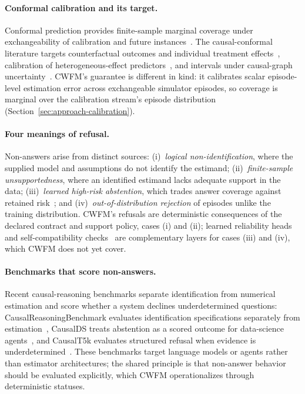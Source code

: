 \documentclass[electronics,article,submit,oneauthor]{Definitions/mdpi}
\begin{document}
\paragraph{Conformal calibration and its target.} Conformal prediction provides finite-sample marginal coverage under exchangeability of calibration and future instances~\cite{vovk2005conformal,lei2018distribution}. The causal-conformal literature targets counterfactual outcomes and individual treatment effects~\cite{lei2021conformal}, calibration of heterogeneous-effect predictors~\cite{vanderlaan2023isotonic}, and intervals under causal-graph uncertainty~\cite{causalguard2026}. CWFM's guarantee is different in kind: it calibrates scalar episode-level estimation error across exchangeable simulator episodes, so coverage is marginal over the calibration stream's episode distribution (Section~\ref{sec:approach-calibration}).

\paragraph{Four meanings of refusal.} Non-answers arise from distinct sources: (i)~\emph{logical non-identification}, where the supplied model and assumptions do not identify the estimand; (ii)~\emph{finite-sample unsupportedness}, where an identified estimand lacks adequate support in the data; (iii)~\emph{learned high-risk abstention}, which trades answer coverage against retained risk~\cite{geifman2017selective}; and (iv)~\emph{out-of-distribution rejection} of episodes unlike the training distribution. CWFM's refusals are deterministic consequences of the declared contract and support policy, cases (i) and (ii); learned reliability heads~\cite{tcpfn2026reliability} and self-compatibility checks~\cite{faller2024selfcompatibility} are complementary layers for cases (iii) and (iv), which CWFM does not yet cover.

\paragraph{Benchmarks that score non-answers.} Recent causal-reasoning benchmarks separate identification from numerical estimation and score whether a system declines underdetermined questions: CausalReasoningBenchmark evaluates identification specifications separately from estimation~\cite{sawarni2026crb}, CausalDS treats abstention as a scored outcome for data-science agents~\cite{leban2026causalds}, and CausalT5k evaluates structured refusal when evidence is underdetermined~\cite{geng2026causalt5k}. These benchmarks target language models or agents rather than estimator architectures; the shared principle is that non-answer behavior should be evaluated explicitly, which CWFM operationalizes through deterministic statuses.
\end{document}
